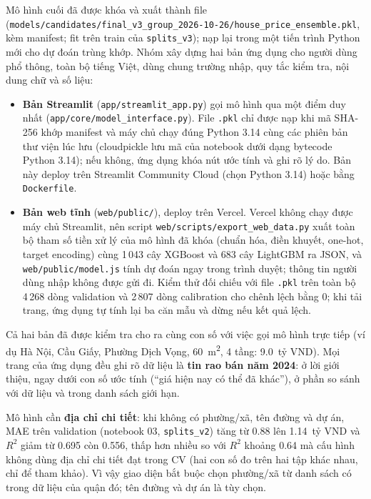 \documentclass[11pt]{article}
\newcommand{\ty}{tỷ VND}
\newcommand{\mtwo}{m\textsuperscript{2}}
\begin{document}
Mô hình cuối đã được khóa và xuất thành file
(\nolinkurl{models/candidates/final_v3_group_2026-10-26/house_price_ensemble.pkl}, kèm manifest; fit trên train của
\texttt{splits\_v3}); nạp lại trong một
tiến trình Python mới cho dự đoán trùng khớp. Nhóm xây dựng hai bản ứng dụng cho người dùng phổ thông, toàn bộ tiếng
Việt, dùng chung trường nhập, quy tắc kiểm tra, nội dung chữ và số liệu:
\begin{itemize}
    \item \textbf{Bản Streamlit} (\nolinkurl{app/streamlit_app.py}) gọi mô hình qua một điểm duy nhất
          (\nolinkurl{app/core/model_interface.py}). File \texttt{.pkl} chỉ được nạp khi mã SHA-256 khớp manifest và
          máy chủ chạy đúng Python 3.14 cùng các phiên bản thư viện lúc lưu (cloudpickle lưu mã của notebook dưới
          dạng bytecode Python 3.14); nếu không, ứng dụng khóa nút ước tính và ghi rõ lý do. Bản này deploy trên
          Streamlit Community Cloud (chọn Python 3.14) hoặc bằng \texttt{Dockerfile}.
    \item \textbf{Bản web tĩnh} (\nolinkurl{web/public/}), deploy trên Vercel. Vercel không chạy được máy chủ
          Streamlit, nên script \nolinkurl{web/scripts/export_web_data.py} xuất toàn bộ tham số tiền xử lý của mô hình
          đã khóa (chuẩn hóa, điền khuyết, one-hot, target encoding) cùng 1\,043 cây XGBoost và 683 cây LightGBM ra
          JSON, và \nolinkurl{web/public/model.js} tính dự đoán ngay trong trình duyệt; thông tin người dùng nhập
          không được gửi đi. Kiểm thử đối chiếu với file \texttt{.pkl} trên toàn bộ 4\,268 dòng validation và
          2\,807 dòng calibration cho chênh lệch bằng 0; khi tải trang, ứng dụng tự tính lại ba căn mẫu và dừng nếu
          kết quả lệch.
\end{itemize}
Cả hai bản đã được kiểm tra cho ra cùng con số với việc gọi mô hình trực tiếp (ví dụ Hà Nội, Cầu Giấy, Phường
Dịch Vọng, 60~\mtwo, 4 tầng: 9.0~\ty).
Mọi trang của ứng dụng đều ghi rõ dữ liệu là \textbf{tin rao bán năm 2024}: ở lời giới thiệu, ngay dưới con số ước
tính (``giá hiện nay có thể đã khác''), ở phần so sánh với dữ liệu và trong danh sách giới hạn.

Mô hình cần \textbf{địa chỉ chi tiết}: khi không có phường/xã, tên đường và dự án, MAE trên validation (notebook 03,
\texttt{splits\_v2}) tăng từ 0.88 lên 1.14~\ty{} và $R^2$ giảm từ 0.695 còn 0.556, thấp hơn nhiều so với $R^2$ khoảng 0.64 mà cấu hình không dùng địa
chỉ chi tiết đạt trong CV (hai con số đo trên hai tập khác nhau, chỉ để tham khảo). Vì vậy giao diện bắt buộc chọn
phường/xã từ danh sách có trong dữ liệu của quận đó; tên đường và dự án là tùy chọn.
\end{document}
